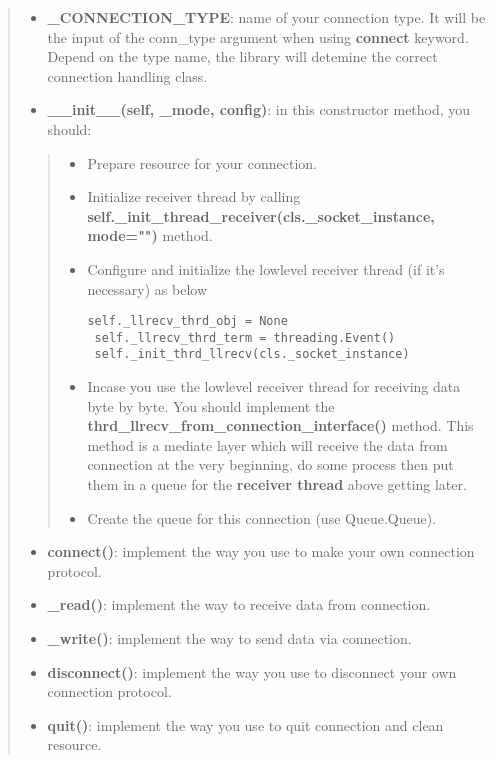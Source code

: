 \begin{quote}
\begin{itemize}
\tightlist
\item
  \textbf{\_CONNECTION\_TYPE}: name of your connection type. It will be
  the input of the conn\_type argument when using \textbf{connect}
  keyword. Depend on the type name, the library will detemine the
  correct connection handling class.
\item
  \textbf{\_\_init\_\_(self, \_mode, config)}: in this constructor
  method, you should:
\end{itemize}

\begin{quote}
\begin{itemize}
\item
  Prepare resource for your connection.
\item
  Initialize receiver thread by calling
  \textbf{self.\_init\_thread\_receiver(cls.\_socket\_instance,
  mode="")} method.
\item
  Configure and initialize the lowlevel receiver thread (if it's
  necessary) as below

\begin{verbatim}
self._llrecv_thrd_obj = None
 self._llrecv_thrd_term = threading.Event()
 self._init_thrd_llrecv(cls._socket_instance)
\end{verbatim}
\item
  Incase you use the lowlevel receiver thread for receiving data byte by byte. You should implement the
  \textbf{thrd\_llrecv\_from\_connection\_interface()} method. This
  method is a mediate layer which will receive the data from connection
  at the very beginning, do some process then put them in a queue for
  the \textbf{receiver thread} above getting later.
\item
  Create the queue for this connection (use Queue.Queue).
\end{itemize}
\end{quote}

\begin{itemize}
\tightlist
\item
  \textbf{connect()}: implement the way you use to make your own
  connection protocol.
\item
  \textbf{\_read()}: implement the way to receive data from connection.
\item
  \textbf{\_write()}: implement the way to send data via connection.
\item
  \textbf{disconnect()}: implement the way you use to disconnect your
  own connection protocol.
\item
  \textbf{quit()}: implement the way you use to quit connection and
  clean resource.
\end{itemize}
\end{quote}


